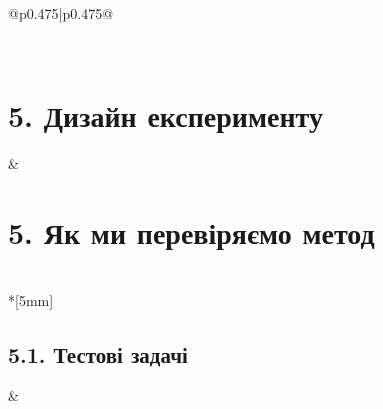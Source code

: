 \documentclass[11pt]{article}
\begin{document}
\begin{longtable}{@{}p{0.475\textwidth}|p{0.475\textwidth}@{}}
\begin{minipage}[t]{\linewidth}
\end{minipage} \\[5mm]
\begin{minipage}[t]{\linewidth}
\section*{5. Дизайн експерименту}

\end{minipage} &
\begin{minipage}[t]{\linewidth}
\section*{5. Як ми перевіряємо метод}

\end{minipage} \\*[5mm]
\begin{minipage}[t]{\linewidth}
\subsection*{5.1. Тестові задачі}
\end{minipage} &
\begin{minipage}[t]{\linewidth}

\end{minipage}
\end{longtable}
\end{document}
